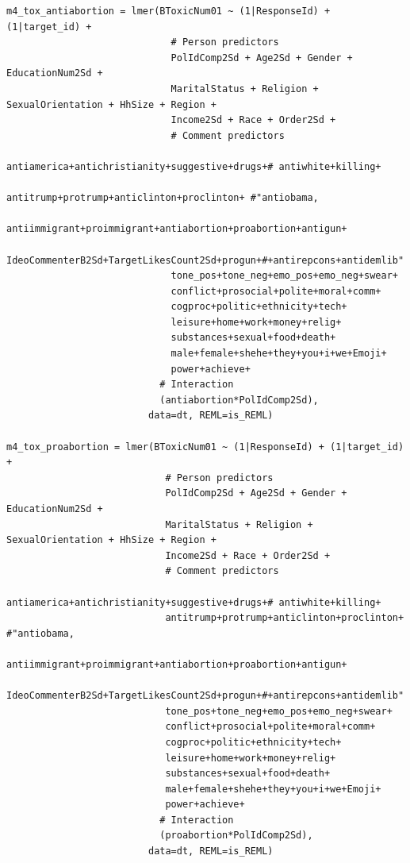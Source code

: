 \documentclass{article}
\begin{document}
\begin{lstlisting}
m4_tox_antiabortion = lmer(BToxicNum01 ~ (1|ResponseId) + (1|target_id) + 
                             # Person predictors
                             PolIdComp2Sd + Age2Sd + Gender + EducationNum2Sd + 
                             MaritalStatus + Religion + SexualOrientation + HhSize + Region + 
                             Income2Sd + Race + Order2Sd + 
                             # Comment predictors  
                             antiamerica+antichristianity+suggestive+drugs+# antiwhite+killing+
                             antitrump+protrump+anticlinton+proclinton+ #"antiobama,
                             antiimmigrant+proimmigrant+antiabortion+proabortion+antigun+
                             IdeoCommenterB2Sd+TargetLikesCount2Sd+progun+#+antirepcons+antidemlib"
                             tone_pos+tone_neg+emo_pos+emo_neg+swear+
                             conflict+prosocial+polite+moral+comm+
                             cogproc+politic+ethnicity+tech+
                             leisure+home+work+money+relig+  
                             substances+sexual+food+death+    
                             male+female+shehe+they+you+i+we+Emoji+
                             power+achieve+
                           # Interaction
                           (antiabortion*PolIdComp2Sd),
                         data=dt, REML=is_REML)

m4_tox_proabortion = lmer(BToxicNum01 ~ (1|ResponseId) + (1|target_id) + 
                            # Person predictors
                            PolIdComp2Sd + Age2Sd + Gender + EducationNum2Sd + 
                            MaritalStatus + Religion + SexualOrientation + HhSize + Region + 
                            Income2Sd + Race + Order2Sd + 
                            # Comment predictors  
                            antiamerica+antichristianity+suggestive+drugs+# antiwhite+killing+
                            antitrump+protrump+anticlinton+proclinton+ #"antiobama,
                            antiimmigrant+proimmigrant+antiabortion+proabortion+antigun+
                            IdeoCommenterB2Sd+TargetLikesCount2Sd+progun+#+antirepcons+antidemlib"
                            tone_pos+tone_neg+emo_pos+emo_neg+swear+
                            conflict+prosocial+polite+moral+comm+
                            cogproc+politic+ethnicity+tech+
                            leisure+home+work+money+relig+  
                            substances+sexual+food+death+    
                            male+female+shehe+they+you+i+we+Emoji+
                            power+achieve+
                           # Interaction
                           (proabortion*PolIdComp2Sd),
                         data=dt, REML=is_REML)


\end{lstlisting}
\end{document}
